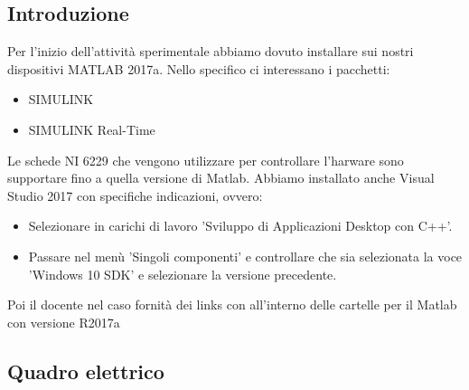 \documentclass{article}
\begin{document}
\subsection{Introduzione}
Per l'inizio dell'attività sperimentale abbiamo dovuto installare sui nostri dispositivi  MATLAB 2017a. Nello specifico ci interessano i pacchetti:
\begin{itemize}
    \item SIMULINK
    \item SIMULINK Real-Time
\end{itemize}
Le schede NI 6229 che vengono utilizzare per controllare l'harware sono supportare fino a quella versione di Matlab.
Abbiamo installato anche Visual Studio 2017 con specifiche indicazioni, ovvero:
\begin{itemize}
    \item Selezionare in carichi di lavoro 'Sviluppo di Applicazioni Desktop con C++'.
    \item Passare nel menù 'Singoli componenti' e controllare che sia selezionata la voce  'Windows 10 SDK' e selezionare la versione precedente.
\end{itemize}
Poi il docente nel caso fornità dei links con all'interno delle cartelle per il Matlab con versione R2017a

\subsection{Quadro elettrico}
\end{document}
